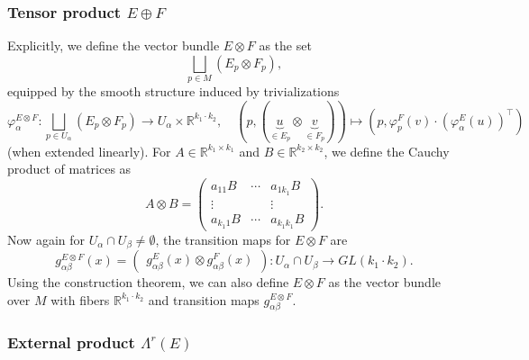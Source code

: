 \documentclass[10pt, a4paper]{article}
\newcommand{\R}{\mathbb {R}}
\begin{document}
\subsubsection*{Tensor product $E \oplus F$}

Explicitly, we define the vector bundle $E \otimes F$ as the set
$$\bigsqcup_{p \in M} (E_p \otimes F_p),$$
equipped by the smooth structure induced by trivializations 
$$\varphi_\alpha ^{E \otimes F} : \bigsqcup_{p \in U_\alpha} (E_p \otimes F_p) \to U_\alpha \times \R^{k_1 \cdot k_2},\quad (p, (\underbrace{u}_{\in E_p} \otimes \underbrace{v}_{\in F_p})) \mapsto (p, \varphi_p ^F (v) \cdot (\varphi_\alpha ^E (u))^\top )$$
(when extended linearly).
For $A \in \R^{k_1 \times k_1}$ and $B \in \R^{k_2 \times k_2}$, we define the Cauchy product of matrices as 
$$A \otimes B = \begin{pmatrix}
  a_{11} B & \cdots & a_{1 k_1} B\\
  \vdots & & \vdots\\
  a_{k_1 1} B & \cdots & a_{k_1 k_1} B
\end{pmatrix}.$$
Now again for $U_\alpha \cap U_\beta \neq \emptyset$, the transition maps for $E \otimes F$ are
$$g_{\alpha \beta} ^{E \otimes F} (x) = \begin{pmatrix}
  g_{\alpha \beta} ^E (x) \otimes g_{\alpha \beta} ^F (x)
\end{pmatrix}: U_\alpha \cap U_\beta \to GL(k_1 \cdot k_2).$$
Using the construction theorem, we can also define $E \otimes F$ as the vector bundle over $M$ with fibers $\R^{k_1 \cdot k_2}$ and transition maps $g_{\alpha \beta} ^{E \otimes F}$.

\subsubsection*{External product $\Lambda^r (E)$}
\end{document}
